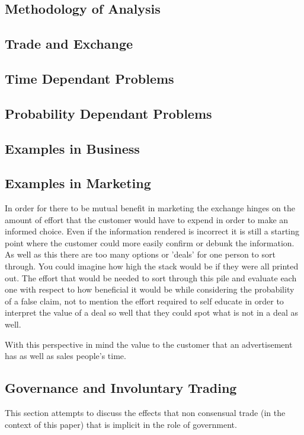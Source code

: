 \documentclass[]{article}
\begin{document}
\subsection{Methodology of Analysis}

\subsection{Trade and Exchange}

\subsection{Time Dependant Problems}

\subsection{Probability Dependant Problems}

\subsection{Examples in Business}

\subsection{Examples in Marketing}
In order for there to be mutual benefit in marketing the exchange hinges on the amount of effort that the customer would have to expend in order to make an informed choice. Even if the information rendered is incorrect it is still a starting point where the customer could more easily confirm or debunk the information. As well as this there are too many options or 'deals' for one person to sort through. You could imagine how high the stack would be if they were all printed out. The effort that would be needed to sort through this pile and evaluate each one with respect to how beneficial it would be while considering the probability of a false claim, not to mention the effort required to self educate in order to interpret the value of a deal so well that they could spot what is not in a deal as well. 

With this perspective in mind the value to the customer that an advertisement has as well as sales people's time. 

\subsection{Governance and Involuntary Trading}
This section attempts to discuss the effects that non consensual trade (in the context of this paper) that is implicit in the role of government.
\end{document}

